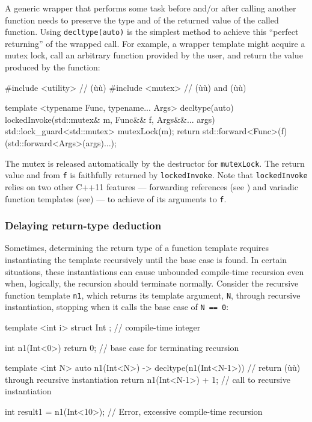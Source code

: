 A generic wrapper that performs some task before and/or after calling
another function needs to preserve the type and 
of the returned value of the called function. Using
\lstinline!decltype(auto)! is the simplest method to achieve this ``perfect
returning'' of the wrapped call. For example, a wrapper template might
acquire a mutex lock, call an arbitrary function provided by the user,
and return the value produced by the function:

\begin{emcppslisting}
#include <utility>  // (ù{}ù)
#include <mutex>    // (ù{}ù) and (ù{}ù)

template <typename Func, typename... Args>
decltype(auto) lockedInvoke(std::mutex& m, Func&& f, Args&&... args)
{
    std::lock_guard<std::mutex> mutexLock(m);
    return std::forward<Func>(f)(std::forward<Args>(args)...);
}
\end{emcppslisting}
    

\noindent The mutex is released automatically by the destructor for
\lstinline!mutexLock!. The return value and  from
\lstinline!f! is faithfully returned by \lstinline!lockedInvoke!. Note that
\lstinline!lockedInvoke! relies on two other C++11 features --- forwarding
references (see ) and variadic function
templates (see\linebreak[4] ) --- to achieve
 of its arguments to \lstinline!f!.

\subsubsection[Delaying return-type deduction]{Delaying return-type deduction}\label{delaying-return-type-deduction}

Sometimes, determining the return type of a function template requires
instantiating the template recursively until the base case is found. In
certain situations, these instantiations can cause unbounded
compile-time recursion even when, logically, the recursion should
terminate normally. Consider the recursive function template
\lstinline!n1!, which returns its template argument, \lstinline!N!, through
recursive instantiation, stopping when it calls the base case of
\lstinline!N!~\lstinline!==!~\lstinline!0!:

\begin{emcppslisting}
template <int i>  struct Int {};  // compile-time integer

int n1(Int<0>) { return 0; }      // base case for terminating recursion

template <int N>
auto n1(Int<N>) -> decltype(n1(Int<N-1>{}))
    // return (ù{}ù) through recursive instantiation
{
    return n1(Int<N-1>{}) + 1;   // call to recursive instantiation
}

int result1 = n1(Int<10>{});     // Error, excessive compile-time recursion
\end{emcppslisting}
    

